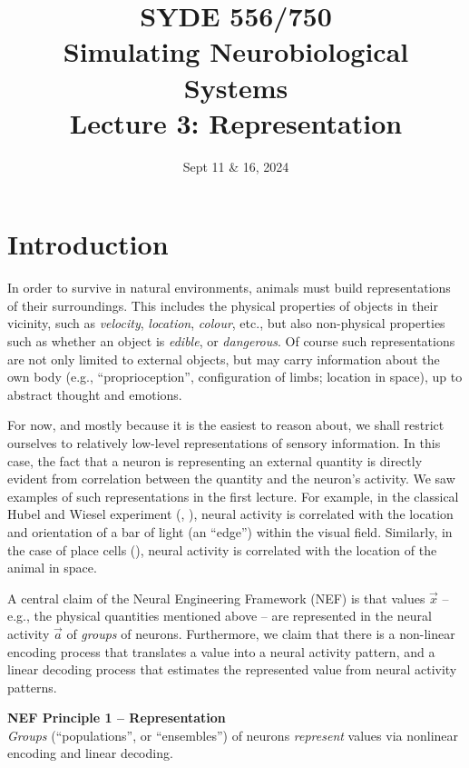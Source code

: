 \documentclass[10pt,letterpaper,oneside]{article}
\date{Sept 11 \& 16, 2024}
\title{SYDE 556/750 \\ Simulating Neurobiological Systems \\ Lecture 3: Representation}
\begin{document}

\section{Introduction}


In order to survive in natural environments, animals must build representations of their surroundings. This includes the physical properties of objects in their vicinity, such as \emph{velocity}, \emph{location}, \emph{colour}, etc., but also non-physical properties such as whether an object is \emph{edible}, or \emph{dangerous}. Of course such representations are not only limited to external objects, but may carry information about the own body (e.g., \enquote{proprioception}, configuration of limbs; location in space), up to abstract thought and emotions.

For now, and mostly because it is the easiest to reason about, we shall restrict ourselves to relatively low-level representations of sensory information. In this case, the fact that a neuron is representing an external quantity is directly evident from correlation between the quantity and the neuron's activity.  We saw examples of such representations in the first lecture. For example, in the classical Hubel and Wiesel experiment (, \cite{hubel1959receptive}), neural activity is correlated with the location and orientation of a bar of light (an \enquote{edge}) within the visual field. Similarly, in the case of place cells (), neural activity is correlated with the location of the animal in space.

A central claim of the Neural Engineering Framework (NEF) is that values $\vec x$ -- e.g., the physical quantities mentioned above -- are represented in the neural activity $\vec a$ of \emph{groups} of neurons. Furthermore, we claim that there is a non-linear encoding process that translates a value into a neural activity pattern, and a linear decoding process that estimates the represented value from neural activity patterns.

\begin{mdframed}
\textbf{NEF Principle 1 -- Representation}\\
\emph{Groups} (\enquote{populations}, or \enquote{ensembles}) of neurons \emph{represent} values via nonlinear encoding and linear decoding.
\end{mdframed}
\end{document}
